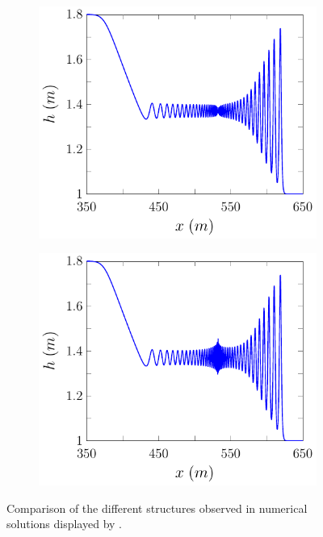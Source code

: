 \begin{figure}
\begin{subfigure}{0.5\textwidth}
		\vspace{0.5cm}
	\end{subfigure}
	\begin{subfigure}{0.5\textwidth}
		\includegraphics[width=\textwidth]{./chp2/figures/DamBreakStruct/9.pdf}
		\vspace{0.5cm}
	\end{subfigure}%
	\begin{subfigure}{0.5\textwidth}
	\includegraphics[width=\textwidth]{./chp2/figures/DamBreakStruct/20.pdf}
		\vspace{0.5cm}
	\end{subfigure}
	\caption{Comparison of the different structures observed in numerical solutions displayed by \citet{Pitt-2018-61}.}
	\label{fig:DBExAll}
\end{figure}


